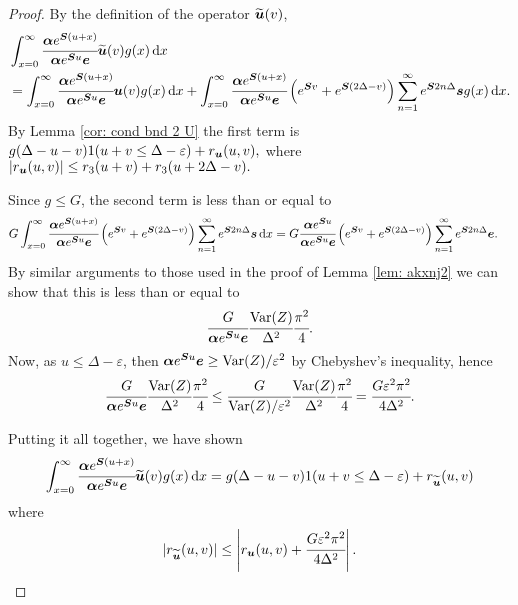 \begin{proof}
	By the definition of the operator \(\widetilde{\boldsymbol u}(v)\), 
	\begin{align}
		&\int_{x=0}^\infty \cfrac{\boldsymbol \alpha  e^{\boldsymbol{S} (u+x)} }{\boldsymbol \alpha  e^{\boldsymbol{S} u} \boldsymbol e} \widetilde{\boldsymbol u}(v)g(x)\, \mathrm{d} x \nonumber		
		\\&= \int_{x=0}^\infty \cfrac{\boldsymbol \alpha  e^{\boldsymbol{S} (u+x)} }{\boldsymbol \alpha  e^{\boldsymbol{S} u} \boldsymbol e} \boldsymbol u(v)g(x)\, \mathrm{d} x + \int_{x=0}^\infty \cfrac{\boldsymbol \alpha  e^{\boldsymbol{S} (u+x)} }{\boldsymbol \alpha  e^{\boldsymbol{S} u} \boldsymbol e} \left(e^{\boldsymbol{S} v} + e^{\boldsymbol{S} (2\Delta-v)}\right)\sum_{n=1}^\infty e^{\boldsymbol S2n\Delta}\boldsymbol s g(x)\, \mathrm{d} x. \label{eqn: ghi is this a2}
	\end{align}
	By Lemma \ref{cor: cond bnd 2 U} the first term is 
	\(g(\Delta-u-v) 1(u+v\leq\Delta-\varepsilon) + r_{\boldsymbol u} (u,v),\)
	where 
	\(\left|r_{\boldsymbol u} (u,v)\right|\leq r_3 (u+v) + r_3 (u+2\Delta - v).\)

	Since \(g\leq G\), the second term is less than or equal to 
	\begin{align*}
		G\int_{x=0}^\infty \cfrac{\boldsymbol \alpha  e^{\boldsymbol{S} (u+x)} }{\boldsymbol \alpha  e^{\boldsymbol{S} u} \boldsymbol e} \left(e^{\boldsymbol{S} v} + e^{\boldsymbol{S} (2\Delta-v)}\right)\sum_{n=1}^\infty e^{\boldsymbol S2n\Delta}\boldsymbol s \, \mathrm{d} x
		&= G \cfrac{\boldsymbol \alpha  e^{\boldsymbol{S} u} }{\boldsymbol \alpha  e^{\boldsymbol{S} u} \boldsymbol e} \left(e^{\boldsymbol{S} v} + e^{\boldsymbol{S} (2\Delta-v)}\right)\sum_{n=1}^\infty e^{\boldsymbol S2n\Delta}\boldsymbol e.
	\end{align*}
	By similar arguments to those used in the proof of Lemma \ref{lem: akxnj2} we can show that this is less than or equal to 
	\begin{align*}
		\cfrac{G}{\boldsymbol \alpha  e^{\boldsymbol{S} u} \boldsymbol e} \cfrac{\mathrm{Var}(Z)}{\Delta^2}\cfrac{\pi^2}{4}.
	\end{align*}
	Now, as \(u\leq \Delta-\varepsilon\), then \(\boldsymbol\alpha e^{\boldsymbol Su}\boldsymbol e\geq \mathrm{Var}(Z)/\varepsilon^2\) by Chebyshev's inequality, hence 
	\begin{align*}
		\cfrac{G}{\boldsymbol \alpha  e^{\boldsymbol{S} u} \boldsymbol e} \cfrac{\mathrm{Var}(Z)}{\Delta^2}\cfrac{\pi^2}{4} \leq \cfrac{G}{\mathrm{Var}(Z)/\varepsilon^2} \cfrac{\mathrm{Var}(Z)}{\Delta^2}\cfrac{\pi^2}{4} = \cfrac{G \varepsilon^2 \pi^2}{4\Delta^2}.
	\end{align*}

	Putting it all together, we have shown 
	\begin{align}
		\int_{x=0}^\infty \cfrac{\boldsymbol \alpha  e^{\boldsymbol{S} (u+x)} }{\boldsymbol \alpha  e^{\boldsymbol{S} u} \boldsymbol e} \widetilde{\boldsymbol u}(v)g(x)\, \mathrm{d} x = g(\Delta-u-v) 1(u+v\leq\Delta-\varepsilon) + r_{\widetilde{\boldsymbol u}} (u,v)
	\end{align}
	where 
	\[|r_{\widetilde{\boldsymbol u}} (u,v)| \leq \left|r_{\boldsymbol u} (u,v) + \cfrac{G \varepsilon^2 \pi^2}{4\Delta^2}\right|.\]
	

\end{proof}
